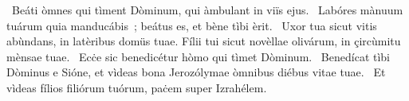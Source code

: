 \psalmChapterWithInscription{}
{ }
{%
~Beáti òmnes qui tìment Dòminum, qui àmbulant in viïs ejus. 
~Labóres mànuum tuárum quia manducábis~; beátus es, et bène tìbi èrit. 
~Uxor tua sicut vitis abùndans, in latèribus domüs tuae. Fílii tui sicut novèllae olivárum, in çircùmitu mènsae tuae. 
~Ecċe sic benedicétur hòmo qui tìmet Dòminum. 
~Benedícat tìbi Dòminus e Sióne, et vìdeas bona Jerozólymae òmnibus diébus vitae tuae. 
~Et vìdeas fílios filiórum tuórum, paċem super Izrahélem. 
}
